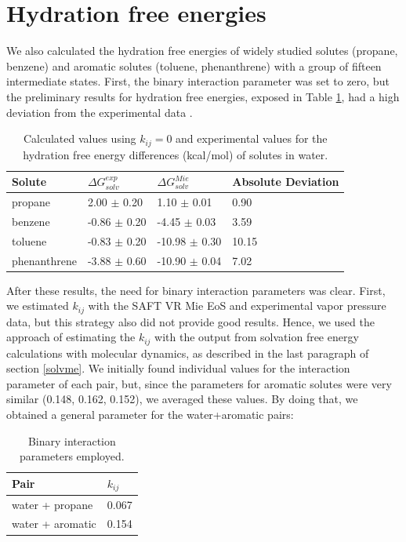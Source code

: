 \section{Hydration free energies}

We also calculated the hydration free energies of widely studied solutes (propane, benzene) and aromatic solutes (toluene, phenanthrene) with a group of fifteen intermediate states. First, the binary interaction parameter was set to zero, but the preliminary results for hydration free energies, exposed in Table \ref{tbl:solv3},  had a high deviation from the experimental data \cite{P29900000291, doi:10.1021/ct050097l}.

\FloatBarrier
\begin{table}[h]
    \centering
    \caption{Calculated values using $k_{ij}=0$ and experimental values for the hydration free energy differences (kcal/mol) of solutes in water.}
    \label{tbl:solv3}
    \begin{tabular}{llll}
        \hline
        Solute  & $\Delta G_{solv}^{exp}$ & $\Delta G_{solv}^{Mie}$& Absolute Deviation\\
        \hline
        propane   & 2.00 $\pm$ 0.20&1.10 $\pm$ 0.01 & 0.90 \\
        benzene  & -0.86 $\pm$ 0.20 & -4.45 $\pm$ 0.03&  3.59 \\
        toluene  & -0.83 $\pm$ 0.20 &-10.98 $\pm$ 0.30&  10.15 \\
        phenanthrene & -3.88 $\pm$ 0.60 &-10.90 $\pm$ 0.04& 7.02  \\
        \hline
    \end{tabular}
\end{table}
\FloatBarrier

After these results, the need for binary interaction parameters was clear. First, we estimated $k_{ij}$ with the SAFT VR Mie EoS and experimental vapor pressure data, but this strategy also did not provide good results. Hence, we used the approach of estimating the $k_{ij}$ with the output from solvation free energy calculations with molecular dynamics, as described in the last paragraph of section \ref{solvme}.  We initially found individual values for the interaction parameter of each pair, but, since the parameters for aromatic solutes were very similar (0.148, 0.162, 0.152), we averaged these values. By doing that,  we obtained a general parameter for the water+aromatic pairs:

\begin{table}[h]
  \centering
  \caption{Binary interaction parameters employed.}
  \label{tbl:kij}
  \begin{tabular}{ll}
    \hline
      Pair & $k_{ij}$ \\
    \hline
    water  + propane      & 0.067  \\
    water  + aromatic      & 0.154 \\  
    \hline
  \end{tabular}
\end{table}

